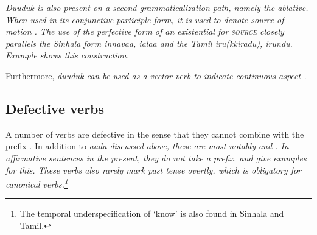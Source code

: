 \em Duuduk \em is also present on a second grammaticalization path, namely the ablative. When used in its conjunctive participle form, it is used to denote source of motion . The  use of the perfective form of an existential for \textsc{source} closely parallels the Sinhala form \em innavaa, i\und alaa \em and the Tamil \em iru(kkiradu), irundu. \em Example  shows this construction.


Furthermore, \em duuduk \em can be used as a vector verb to indicate continuous aspect .


\subsection{Defective verbs}\label{sec:wc:Defectiveverbs}
A number of verbs are defective in the sense that they cannot combine with the  prefix . In addition to \em aada \em discussed above, these are most notably  and . In affirmative sentences in the present, they do not take a prefix.  and  give examples for this. These verbs also rarely mark past tense overtly, which is obligatory for canonical verbs.\footnote{The temporal underspecification of `know' is also found in Sinhala   and Tamil.}









